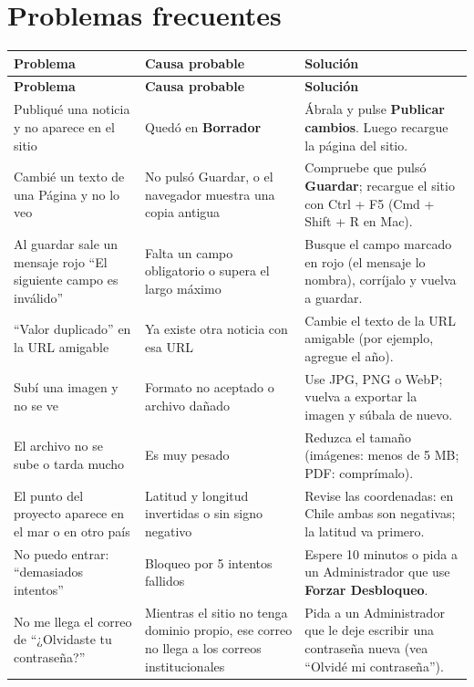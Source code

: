 \documentclass[11pt,letterpaper]{report}
\begin{document}
\chapter{Problemas frecuentes}
\begin{longtable}{>{\raggedright\arraybackslash}p{}>{\raggedright\arraybackslash}p{}>{\raggedright\arraybackslash}p{}}
\rowcolor{h2vazul}\textbf{\color{white}Problema} & \textbf{\color{white}Causa probable} & \textbf{\color{white}Solución} \\
\endfirsthead
\rowcolor{h2vazul}\textbf{\color{white}Problema} & \textbf{\color{white}Causa probable} & \textbf{\color{white}Solución} \\
\endhead
Publiqué una noticia y no aparece en el sitio & Quedó en \textbf{Borrador} & Ábrala y pulse \textbf{Publicar cambios}. Luego recargue la página del sitio. \\ \midrule
\rowcolor{filaalt}Cambié un texto de una Página y no lo veo & No pulsó Guardar, o el navegador muestra una copia antigua & Compruebe que pulsó \textbf{Guardar}; recargue el sitio con Ctrl + F5 (Cmd + Shift + R en Mac). \\ \midrule
Al guardar sale un mensaje rojo “El siguiente campo es inválido” & Falta un campo obligatorio o supera el largo máximo & Busque el campo marcado en rojo (el mensaje lo nombra), corríjalo y vuelva a guardar. \\ \midrule
\rowcolor{filaalt}“Valor duplicado” en la URL amigable & Ya existe otra noticia con esa URL & Cambie el texto de la URL amigable (por ejemplo, agregue el año). \\ \midrule
Subí una imagen y no se ve & Formato no aceptado o archivo dañado & Use JPG, PNG o WebP; vuelva a exportar la imagen y súbala de nuevo. \\ \midrule
\rowcolor{filaalt}El archivo no se sube o tarda mucho & Es muy pesado & Reduzca el tamaño (imágenes: menos de 5 MB; PDF: comprímalo). \\ \midrule
El punto del proyecto aparece en el mar o en otro país & Latitud y longitud invertidas o sin signo negativo & Revise las coordenadas: en Chile ambas son negativas; la latitud va primero. \\ \midrule
\rowcolor{filaalt}No puedo entrar: “demasiados intentos” & Bloqueo por 5 intentos fallidos & Espere 10 minutos o pida a un Administrador que use \textbf{Forzar Desbloqueo}. \\ \midrule
No me llega el correo de “¿Olvidaste tu contraseña?” & Mientras el sitio no tenga dominio propio, ese correo no llega a los correos institucionales & Pida a un Administrador que le deje escribir una contraseña nueva (vea “Olvidé mi contraseña”). \\ \midrule

\end{longtable}
\end{document}
